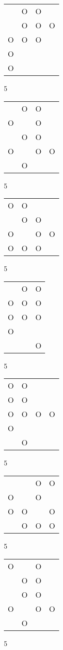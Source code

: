 \begin{tabular}{|m{0.2cm}m{0.2cm}m{0.2cm}m{0.2cm}|}\hline
 &O&O& \\
 &O&O&O\\
O&O&O& \\
O& & & \\
O& & & \\
\hline\end{tabular}5
\begin{tabular}{|m{0.2cm}m{0.2cm}m{0.2cm}m{0.2cm}|}\hline
 &O&O& \\
O& &O& \\
 &O&O& \\
O& &O&O\\
 &O& & \\
\hline\end{tabular}5
\begin{tabular}{|m{0.2cm}m{0.2cm}m{0.2cm}m{0.2cm}|}\hline
O&O& & \\
 &O&O& \\
O& &O&O\\
O&O&O& \\
\hline\end{tabular}5
\begin{tabular}{|m{0.2cm}m{0.2cm}m{0.2cm}|}\hline
 &O&O\\
O&O&O\\
O&O&O\\
O& & \\
 & &O\\
\hline\end{tabular}5
\begin{tabular}{|m{0.2cm}m{0.2cm}m{0.2cm}m{0.2cm}|}\hline
O&O& & \\
O&O& & \\
O&O&O&O\\
O& & & \\
 &O& & \\
\hline\end{tabular}5
\begin{tabular}{|m{0.2cm}m{0.2cm}m{0.2cm}m{0.2cm}|}\hline
 & &O&O\\
O& &O& \\
O&O& &O\\
 &O&O&O\\
\hline\end{tabular}5
\begin{tabular}{|m{0.2cm}m{0.2cm}m{0.2cm}m{0.2cm}|}\hline
O& &O& \\
 &O&O& \\
 &O&O& \\
O& &O&O\\
 &O& & \\
\hline\end{tabular}5
